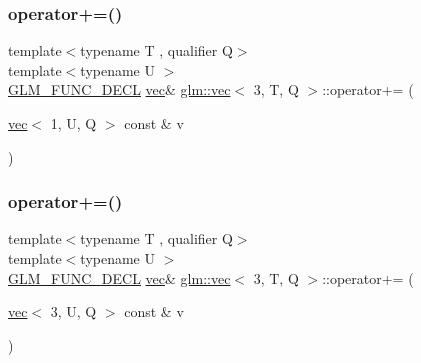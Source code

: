 \subsubsection{\texorpdfstring{operator+=()}{operator+=()}\hspace{0.1cm}{\footnotesize\ttfamily [3/6]}}
{\footnotesize\ttfamily template$<$typename T , qualifier Q$>$ \\
template$<$typename U $>$ \\
\hyperlink{setup_8hpp_ab2d052de21a70539923e9bcbf6e83a51}{G\+L\+M\+\_\+\+F\+U\+N\+C\+\_\+\+D\+E\+CL} \hyperlink{structglm_1_1vec}{vec}\& \hyperlink{structglm_1_1vec}{glm\+::vec}$<$ 3, T, Q $>$\+::operator+= (\begin{DoxyParamCaption}\item[{\hyperlink{structglm_1_1vec}{vec}$<$ 1, U, Q $>$ const \&}]{v }\end{DoxyParamCaption})}

\mbox{\label{structglm_1_1vec_3_013_00_01_t_00_01_q_01_4_af225b4b2d835609198480cd692c088d8}} 
\subsubsection{\texorpdfstring{operator+=()}{operator+=()}\hspace{0.1cm}{\footnotesize\ttfamily [4/6]}}
{\footnotesize\ttfamily template$<$typename T , qualifier Q$>$ \\
template$<$typename U $>$ \\
\hyperlink{setup_8hpp_ab2d052de21a70539923e9bcbf6e83a51}{G\+L\+M\+\_\+\+F\+U\+N\+C\+\_\+\+D\+E\+CL} \hyperlink{structglm_1_1vec}{vec}\& \hyperlink{structglm_1_1vec}{glm\+::vec}$<$ 3, T, Q $>$\+::operator+= (\begin{DoxyParamCaption}\item[{\hyperlink{structglm_1_1vec}{vec}$<$ 3, U, Q $>$ const \&}]{v }\end{DoxyParamCaption})}

\mbox{\label{structglm_1_1vec_3_013_00_01_t_00_01_q_01_4_aeed08e334ed3515bdb2050d15877bbe8}} 
